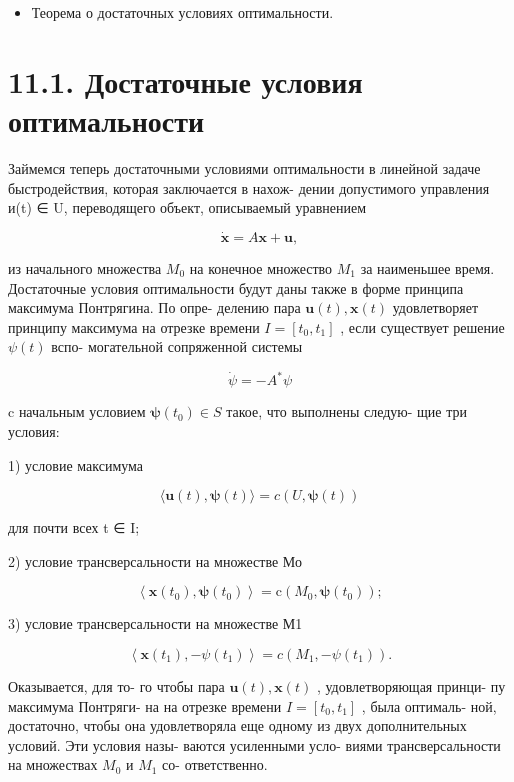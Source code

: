 \documentclass[8pt]{extarticle}
\begin{document}
\begin{itemize}\relax
\item\relax Теорема о достаточных условиях оптимальности.
\end{itemize}

\section*{11.1. Достаточные условия оптимальности}

Займемся теперь достаточными условиями оптимальности в линейной задаче быстродействия, которая заключается в нахож- дении допустимого управления и(t) ∈ U, переводящего объект, описываемый уравнением

\[
\dot{\mathbf{x}} = A\mathbf{x} + \mathbf{u}, \tag{11.1}
\]

из начального множества \({M}_{0}\) на конечное множество \({M}_{1}\) за наименьшее время. Достаточные условия оптимальности будут даны также в форме принципа максимума Понтрягина. По опре- делению пара \(\mathbf{u}\left( t\right) ,\mathbf{x}\left( t\right)\) удовлетворяет принципу максимума на отрезке времени \(I = \left\lbrack  {{t}_{0},{t}_{1}}\right\rbrack\) , если существует решение \(\psi \left( t\right)\) вспо- могательной сопряженной системы

\[
\dot{\psi } =  - {A}^{ * }\psi \tag{11.2}
\]

c начальным условием \(\mathbf{\psi }\left( {t}_{0}\right)  \in  S\) такое, что выполнены следую- щие три условия:

1) условие максимума

\[
\langle \mathbf{u}\left( t\right) ,\mathbf{\psi }\left( t\right) \rangle  = c\left( {U,\mathbf{\psi }\left( t\right) }\right) \tag{11.3}
\]

для почти всех t ∈ I;

2) условие трансверсальности на множестве Мо

\[
\left\langle  {\mathbf{x}\left( {t}_{0}\right) ,\mathbf{\psi }\left( {t}_{0}\right) }\right\rangle   = \mathrm{c}\left( {{M}_{0},\mathbf{\psi }\left( {t}_{0}\right) }\right) ; \tag{11.4}
\]

3) условие трансверсальности на множестве М1

\[
\left\langle  {\mathbf{x}\left( {t}_{1}\right) , - \psi \left( {t}_{1}\right) }\right\rangle   = c\left( {{M}_{1}, - \psi \left( {t}_{1}\right) }\right) . \tag{11.5}
\]

Оказывается, для то- го чтобы пара \(\mathbf{u}\left( t\right) ,\mathbf{x}\left( t\right)\) , удовлетворяющая принци- пу максимума Понтряги- на на отрезке времени \(I = \left\lbrack  {{t}_{0},{t}_{1}}\right\rbrack\) , была оптималь- ной, достаточно, чтобы она удовлетворяла еще одному из двух дополнительных условий. Эти условия назы- ваются усиленными усло- виями трансверсальности на множествах \({M}_{0}\) и \({M}_{1}\) со- ответственно.
\end{document}
